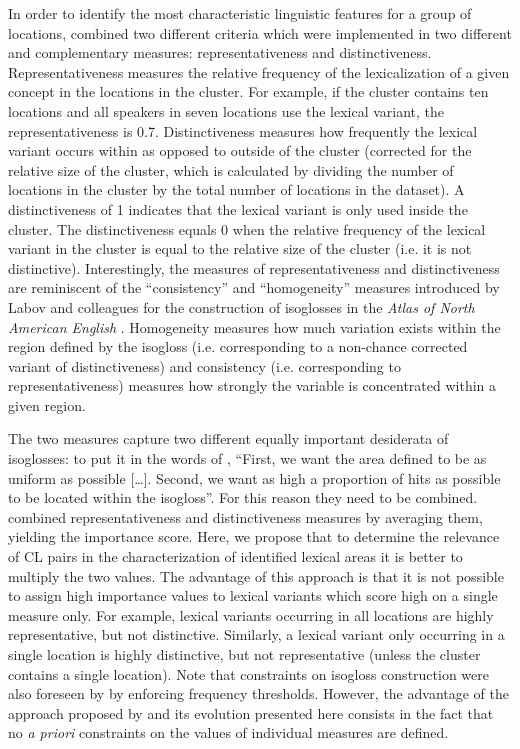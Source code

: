 \documentclass[output=paper]{LSP/langsci}
\begin{document}
In order to identify the most characteristic linguistic features for a group of locations, \citet{wieling_bipartite_2011} combined two different criteria which were implemented in two different and complementary measures: representativeness and distinctiveness. Representativeness measures the relative frequency of the lexicalization of a given concept in the locations in the cluster. For example, if the cluster contains ten locations and all speakers in seven locations use the lexical variant, the representativeness is 0.7. Distinctiveness measures how frequently the lexical variant occurs within as opposed to outside of the cluster (corrected for the relative size of the cluster, which is calculated by dividing the number of locations in the cluster by the total number of locations in the dataset). A distinctiveness of 1 indicates that the lexical variant is only used inside the cluster. The distinctiveness equals 0 when the relative frequency of the lexical variant in the cluster is equal to the relative size of the cluster (i.e. it is not distinctive). Interestingly, the measures of representativeness and distinctiveness are reminiscent of the “consistency” and “homogeneity” measures introduced by Labov and colleagues for the construction of isoglosses in the \textit{Atlas of North American English} \citep{labov_atlas_2006-1}. Homogeneity measures how much variation exists within the region defined by the isogloss (i.e. corresponding to a non-chance corrected variant of distinctiveness) and consistency (i.e. corresponding to representativeness) measures how strongly the variable is concentrated within a given region.

The two measures capture two different equally important desiderata of isoglosses: to put it in the words of \citet{labov_atlas_2006-1}, “First, we want the area defined to be as uniform as possible […]. Second, we want as high a proportion of hits as possible to be located within the isogloss”. For this reason they need to be combined. \citet{wieling_bipartite_2011} combined representativeness and distinctiveness measures by averaging them, yielding the importance score. Here, we propose that to determine the relevance of CL pairs in the characterization of identified lexical areas it is better to multiply the two values. The advantage of this approach is that it is not possible to assign high importance values to lexical variants which score high on a single measure only. For example, lexical variants occurring in all locations are highly representative, but not distinctive. Similarly, a lexical variant only occurring in a single location is highly distinctive, but not representative (unless the cluster contains a single location). Note that constraints on isogloss construction were also foreseen by \citet{labov_atlas_2006-1} by enforcing frequency thresholds. However, the advantage of the approach proposed by \citet{wieling_bipartite_2011} and its evolution presented here consists in the fact that no \textit{a priori} constraints on the values of individual measures are defined.
\end{document}
